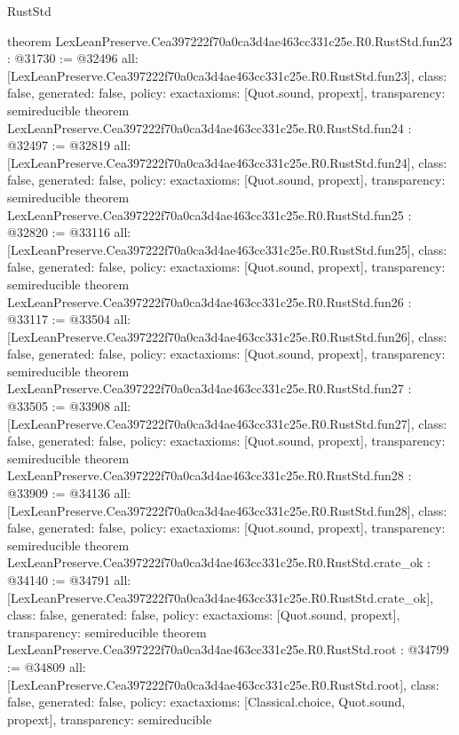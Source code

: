 \begin{lexlean}{RustStd}
\begin{coremodule}
{}
theorem LexLeanPreserve.Cea397222f70a0ca3d4ae463cc331c25e.R0.RustStd.fun23 : @31730 := @32496 {
  all: [LexLeanPreserve.Cea397222f70a0ca3d4ae463cc331c25e.R0.RustStd.fun23],
  class: false,
  generated: false,
  policy: exact{axioms: [Quot.sound, propext]},
  transparency: semireducible
}
theorem LexLeanPreserve.Cea397222f70a0ca3d4ae463cc331c25e.R0.RustStd.fun24 : @32497 := @32819 {
  all: [LexLeanPreserve.Cea397222f70a0ca3d4ae463cc331c25e.R0.RustStd.fun24],
  class: false,
  generated: false,
  policy: exact{axioms: [Quot.sound, propext]},
  transparency: semireducible
}
theorem LexLeanPreserve.Cea397222f70a0ca3d4ae463cc331c25e.R0.RustStd.fun25 : @32820 := @33116 {
  all: [LexLeanPreserve.Cea397222f70a0ca3d4ae463cc331c25e.R0.RustStd.fun25],
  class: false,
  generated: false,
  policy: exact{axioms: [Quot.sound, propext]},
  transparency: semireducible
}
theorem LexLeanPreserve.Cea397222f70a0ca3d4ae463cc331c25e.R0.RustStd.fun26 : @33117 := @33504 {
  all: [LexLeanPreserve.Cea397222f70a0ca3d4ae463cc331c25e.R0.RustStd.fun26],
  class: false,
  generated: false,
  policy: exact{axioms: [Quot.sound, propext]},
  transparency: semireducible
}
theorem LexLeanPreserve.Cea397222f70a0ca3d4ae463cc331c25e.R0.RustStd.fun27 : @33505 := @33908 {
  all: [LexLeanPreserve.Cea397222f70a0ca3d4ae463cc331c25e.R0.RustStd.fun27],
  class: false,
  generated: false,
  policy: exact{axioms: [Quot.sound, propext]},
  transparency: semireducible
}
theorem LexLeanPreserve.Cea397222f70a0ca3d4ae463cc331c25e.R0.RustStd.fun28 : @33909 := @34136 {
  all: [LexLeanPreserve.Cea397222f70a0ca3d4ae463cc331c25e.R0.RustStd.fun28],
  class: false,
  generated: false,
  policy: exact{axioms: [Quot.sound, propext]},
  transparency: semireducible
}
theorem LexLeanPreserve.Cea397222f70a0ca3d4ae463cc331c25e.R0.RustStd.crate_ok : @34140 := @34791 {
  all: [LexLeanPreserve.Cea397222f70a0ca3d4ae463cc331c25e.R0.RustStd.crate_ok],
  class: false,
  generated: false,
  policy: exact{axioms: [Quot.sound, propext]},
  transparency: semireducible
}
theorem LexLeanPreserve.Cea397222f70a0ca3d4ae463cc331c25e.R0.RustStd.root : @34799 := @34809 {
  all: [LexLeanPreserve.Cea397222f70a0ca3d4ae463cc331c25e.R0.RustStd.root],
  class: false,
  generated: false,
  policy: exact{axioms: [Classical.choice, Quot.sound, propext]},
  transparency: semireducible
}


\end{coremodule}
\end{lexlean}
